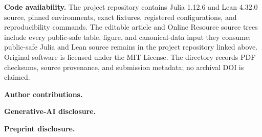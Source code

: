 \documentclass[pdflatex,sn-mathphys-ay]{sn-jnl}
\numberwithin{equation}{section}
\theoremstyle{definition}
\theoremstyle{plain}
\newcommand{\DeclarationHead}[1]{%
  \par\medskip\noindent\textbf{#1.}\enspace}
\begin{document}
\DeclarationHead{Code availability}
The project repository contains Julia 1.12.6 and Lean 4.32.0 source, pinned
environments, exact fixtures, registered configurations, and reproducibility
commands. The editable article and Online Resource source trees include every
public-safe table, figure, and canonical-data input they consume; public-safe
Julia and Lean source remains in the project repository linked above.
Original software is licensed under the MIT License. The
 directory records PDF checksums, source provenance,
and submission metadata; no archival DOI is claimed.

\DeclarationHead{Author contributions}
\AORAuthorContributionStatement

\DeclarationHead{Generative-AI disclosure}
\AORGenerativeAIDisclosureStatement

\DeclarationHead{Preprint disclosure}
\AORPreprintDisclosureStatement


\end{document}
